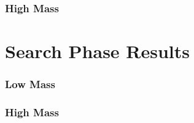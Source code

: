 \subsubsection{High Mass}
\label{sec:highmass_signalInj}

\section{Search Phase Results}

\subsubsection{Low Mass}
\label{sec:bkg-lowmass_results}

\subsubsection{High Mass}
\label{sec:bkg-highmass_results}
